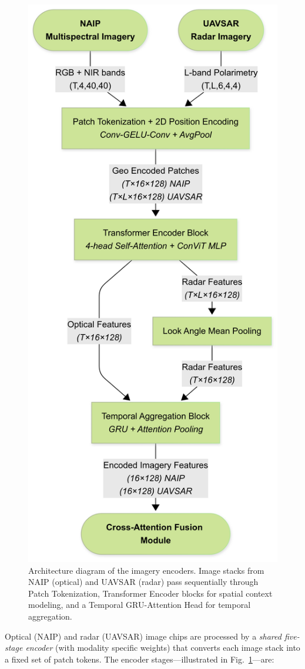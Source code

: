 \documentclass[remotesensing,article,submit,pdftex,moreauthors]{Definitions/mdpi}
\begin{document}
\begin{figure}
    \centering
    \includegraphics[trim=0mm 0mm 20mm 0mm, clip, width=0.7\linewidth]{manuscript/figures/Imagery_Encoders.png}
    \caption{Architecture diagram of the imagery encoders. Image stacks from NAIP (optical) and UAVSAR (radar) pass sequentially through Patch Tokenization, Transformer Encoder blocks for spatial context modeling, and a Temporal GRU-Attention Head for temporal aggregation.}
    \label{fig:imgenc}
\end{figure}

Optical (NAIP) and radar (UAVSAR) image chips are processed by a \emph{shared five-stage encoder} (with modality specific weights) that converts each image stack into a fixed set of patch tokens. The encoder stages—illustrated in Fig.~\ref{fig:imgenc}—are:
\end{document}
